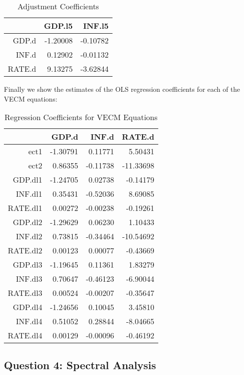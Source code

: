 \documentclass[a4paper,12pt]{article}
\theoremstyle{remark}
\begin{document}
\begin{table}[H]
\centering
\begin{tabular}{rrr}
  \hline
 & GDP.l5 & INF.l5 \\ 
  \hline
GDP.d & -1.20008 & -0.10782 \\ 
  INF.d & 0.12902 & -0.01132 \\ 
  RATE.d & 9.13275 & -3.62844 \\ 
   \hline
\end{tabular}
\caption{Adjustment Coefficients} 
\label{tab:alpha_mat}
\end{table}

Finally we show the estimates of the OLS regression coefficients for each of the VECM equations:

\begin{table}[H]
\centering
\begin{tabular}{rrrr}
  \hline
 & GDP.d & INF.d & RATE.d \\ 
  \hline
ect1 & -1.30791 & 0.11771 & 5.50431 \\ 
  ect2 & 0.86355 & -0.11738 & -11.33698 \\ 
  GDP.dl1 & -1.24705 & 0.02738 & -0.14179 \\ 
  INF.dl1 & 0.35431 & -0.52036 & 8.69085 \\ 
  RATE.dl1 & 0.00272 & -0.00238 & -0.19261 \\ 
  GDP.dl2 & -1.29629 & 0.06230 & 1.10433 \\ 
  INF.dl2 & 0.73815 & -0.34464 & -10.54692 \\ 
  RATE.dl2 & 0.00123 & 0.00077 & -0.43669 \\ 
  GDP.dl3 & -1.19645 & 0.11361 & 1.83279 \\ 
  INF.dl3 & 0.70647 & -0.46123 & -6.90044 \\ 
  RATE.dl3 & 0.00524 & -0.00207 & -0.35647 \\ 
  GDP.dl4 & -1.24656 & 0.10045 & 3.45810 \\ 
  INF.dl4 & 0.51052 & 0.28844 & -8.04665 \\ 
  RATE.dl4 & 0.00129 & -0.00096 & -0.46192 \\ 
   \hline
\end{tabular}
\caption{Regression Coefficients for VECM Equations} 
\label{tab:vecm_coef}
\end{table}

\subsection*{Question 4: Spectral Analysis}
\end{document}
